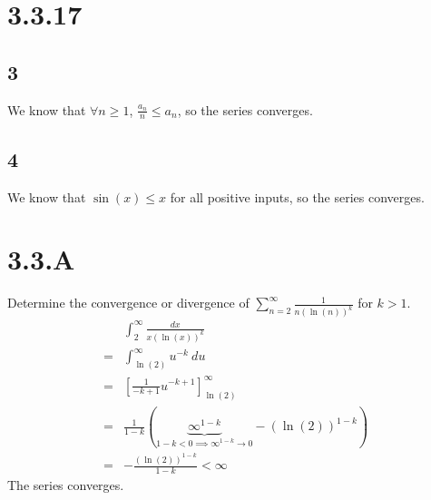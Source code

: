 \documentclass[12pt]{article}
\newcommand{\round}[1]{\left(       #1 \right)      }
\newcommand{\hard} [1]{\left[       #1 \right]      }
\begin{document}
\section*{3.3.17}

\subsection*{3}
We know that $\forall n \geq 1$, $\frac{a_n}{n} \leq a_n$, so the series converges.

\subsection*{4}
We know that $\sin(x) \leq x$ for all positive inputs, so the series converges.



\section*{3.3.A}
Determine the convergence or divergence of $\sum_{n=2}^\infty \frac{1}{n(\ln(n))^{k}}$ for $k>1$.
\begin{align*}
     & \int_{2}^\infty \frac{dx}{x (\ln(x))^k} \\
    =& \int_{\ln(2)}^\infty u^{-k}\ du \\
    =& \hard{\frac{1}{-k+1} u^{-k+1}}_{\ln(2)}^\infty \\
    =& \frac{1}{1-k} \round{\underbrace{\infty^{1-k}}_{1-k<0 \implies \infty^{1-k} \to 0} - (\ln(2))^{1-k}} \\
    =& -\frac{(\ln(2))^{1-k}}{1-k} < \infty
\end{align*}
The series converges.
\end{document}
